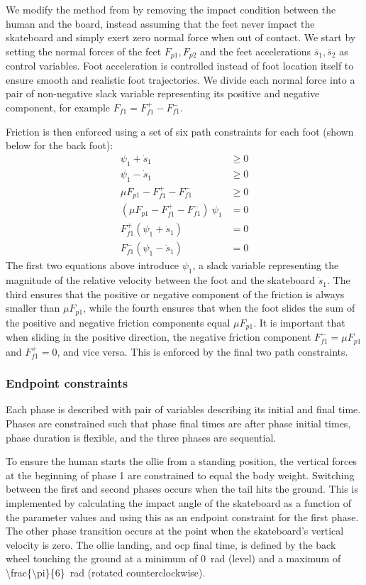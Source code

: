 \documentclass[default,iicol]{sn-jnl}
\begin{document}
We modify the method from \cite{patel_contact-implicit_2019} by removing the impact condition between the human and the board, instead assuming that the feet never impact the skateboard and simply exert zero normal force when out of contact.
We start by setting the normal forces of the feet $F_{p1}, F_{p2}$ and the feet accelerations $\ddot{s_1}, \ddot{s_2}$ as control variables.
Foot acceleration is controlled instead of foot location itself to ensure smooth and realistic foot trajectories.
We divide each normal force into a pair of non-negative slack variable representing its positive and negative component, for example $F_{f1} = F_{f1}^+ - F_{f1}^-$.

Friction is then enforced using a set of six path constraints for each foot (shown below for the back foot):
\begin{align} \label{e_frictioncontrol}
    \psi_1 + \dot s_1  &\geq 0 \\
    \psi_1 - \dot s_1  &\geq 0 \\
    \mu F_{p1} - F_{f1}^+ - F_{f1}^- &\geq 0 \\
    (\mu F_{p1} - F_{f1}^+ - F_{f1}^-)\ \psi_1  &= 0 \\
    F_{f1}^+ (\psi_1 + \dot s_1)  &= 0 \\
    F_{f1}^- (\psi_1 - \dot s_1)  &= 0
\end{align}
The first two equations above introduce $\psi_1$, a slack variable representing the magnitude of the relative velocity between the foot and the skateboard $\dot{s}_1$. The third ensures that the positive or negative component of the friction is always smaller than $\mu F_{p1}$, while the fourth ensures that when the foot slides the sum of the positive and negative friction components equal $\mu F_{p1}$. It is important that when sliding in the positive direction, the negative friction component $F_{f1}^- = \mu F_{p1}$ and $F_{f1}^+=0$, and vice versa. This is enforced by the final two path constraints.

\subsubsection{Endpoint constraints} \label{p_endpoints}
Each phase is described with pair of variables describing its initial and final time. Phases are constrained such that phase final times are after phase initial times, phase duration is flexible, and the three phases are sequential.

To ensure the human starts the ollie from a standing position, the vertical forces at the beginning of phase 1 are constrained to equal the body weight.
Switching between the first and second phases occurs when the tail hits the ground.
This is implemented by calculating the impact angle of the skateboard as a function of the parameter values and using this as an endpoint constraint for the first phase.
The other phase transition occurs at the point when the skateboard's vertical velocity is zero.
The ollie landing, and \gls{ocp} final time, is defined by the back wheel touching the ground at a minimum of \SI{0}{\radian} (level) and a maximum of \SI[parse-numbers = false, number-math-rm = \ensuremath]{\frac{\pi}{6}}{\radian} (rotated counterclockwise).
\end{document}
